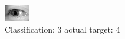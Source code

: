 \begin{figure}[h!]
\begin{center}
\includegraphics[width=0.60\columnwidth]{figures/ID3272_class_3_target_4.png}
\end{center}
\caption{ Classification: 3 actual target: 4}
\label{fig:ID3272_class_3_target_4}
\end{figure}
